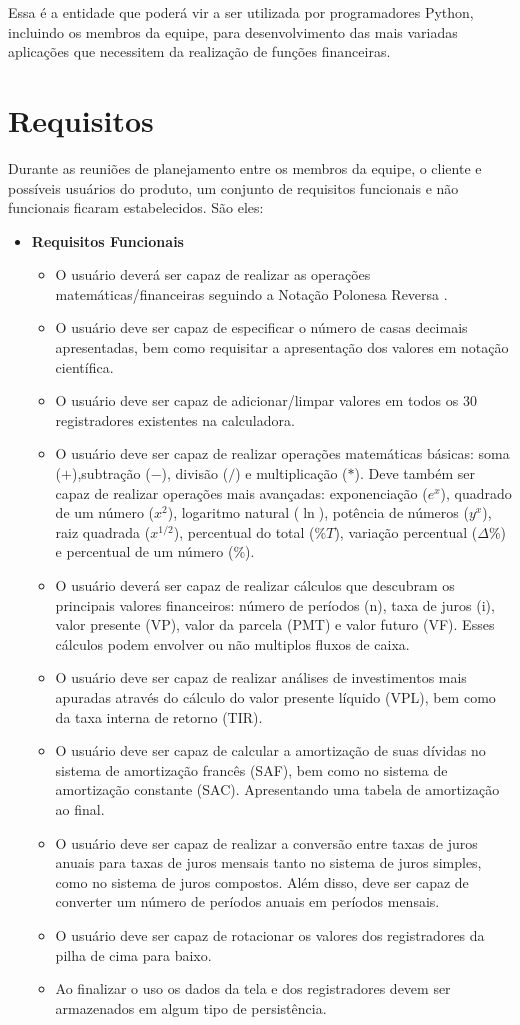 Essa é a entidade que poderá vir a ser utilizada por programadores Python, incluindo os membros da equipe, para desenvolvimento das mais variadas aplicações que necessitem da realização de funções financeiras.

\section{Requisitos}

Durante as reuniões de planejamento entre os membros da equipe, o cliente e possíveis usuários do produto, um conjunto de requisitos funcionais e não funcionais ficaram estabelecidos. São eles:

\begin{itemize}
 \item \textbf{Requisitos Funcionais}
	\begin{itemize}
 	\item O usuário deverá ser capaz de realizar as operações matemáticas/financeiras seguindo a Notação Polonesa Reversa \cite{NPR}.
	\item O usuário deve ser capaz de especificar o número de casas decimais apresentadas, bem como requisitar a apresentação dos valores em notação científica.
	\item O usuário deve ser capaz de adicionar/limpar valores em todos os 30 registradores existentes na calculadora. 
	\item O usuário deve ser capaz de realizar operações matemáticas básicas: soma ($+$),subtração ($-$), divisão ($/$) e multiplicação ($*$). Deve também ser capaz de realizar operações mais avançadas: exponenciação ($ e^{x} $), quadrado de um número ($x^{2}$), logaritmo natural ($\ln$), potência de números ($y^{x}$), raiz quadrada ($x^{1/2}$), percentual do total ($\%T$), variação percentual ($\Delta\%$) e percentual de um número ($\%$).
	\item O usuário deverá ser capaz de realizar cálculos que descubram os principais valores financeiros: número de períodos (n), taxa de juros (i), valor presente (VP), valor da parcela (PMT) e valor futuro (VF). Esses cálculos podem envolver ou não multiplos fluxos de caixa.
	\item O usuário deve ser capaz de realizar análises de investimentos mais apuradas através do cálculo do valor presente líquido (VPL), bem como da taxa interna de retorno (TIR).
	\item O usuário deve ser capaz de calcular a amortização de suas dívidas no sistema de amortização francês (SAF), bem como no sistema de amortização constante (SAC). Apresentando uma tabela de amortização ao final.
	\item O usuário deve ser capaz de realizar a conversão entre taxas de juros anuais para taxas de juros mensais tanto no sistema de juros simples, como no sistema de juros compostos. Além disso, deve ser capaz de converter um número de períodos anuais em períodos mensais.
	\item O usuário deve ser capaz de rotacionar os valores dos registradores da pilha de cima para baixo.
	\item Ao finalizar o uso os dados da tela e dos registradores devem ser armazenados em algum tipo de persistência.
	

\end{itemize}
\end{itemize}
